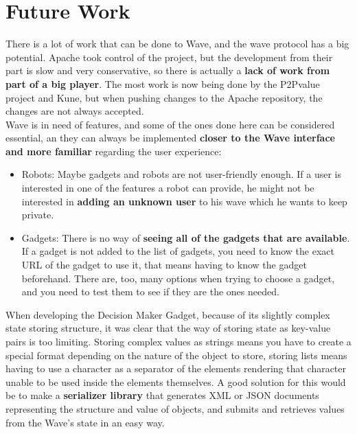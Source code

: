 \section{Future Work}
There is a lot of work that can be done to Wave, and the wave protocol has a big potential. Apache took control of the project, but the development from their part is slow and very conservative, so there is actually a \textbf{lack of work from part of a big player}. The most work is now being done by the P2Pvalue project and Kune, but when pushing changes to the Apache repository, the changes are not always accepted.\\[.2cm]
Wave is in need of features, and some of the ones done here can be considered essential, an they can always be implemented \textbf{closer to the Wave interface and more familiar} regarding the user experience:
\begin{itemize}
  \item Robots: Maybe gadgets and robots are not user-friendly enough. If a user is interested in one of the features a robot can provide, he might not be interested in \textbf{adding an unknown user} to his wave which he wants to keep private.
  \item Gadgets: There is no way of \textbf{seeing all of the gadgets that are available}. If a gadget is not added to the list of gadgets, you need to know the exact URL of the gadget to use it, that means having to know the gadget beforehand. There are, too, many options when trying to choose a gadget, and you need to test them to see if they are the ones needed.
\end{itemize}
When developing the Decision Maker Gadget, because of its slightly complex state storing structure, it was clear that the way of storing state as key-value pairs is too limiting. Storing complex values as strings means you have to create a special format depending on the nature of the object to store, storing lists means having to use a character as a separator of the elements rendering that character unable to be used inside the elements themselves. A good solution for this would be to make a \textbf{serializer library} that generates XML or JSON documents representing the structure and value of objects, and submits and retrieves values from the  Wave's state in an easy way.


\rhead{}
\renewcommand{\headrulewidth}{0pt}
